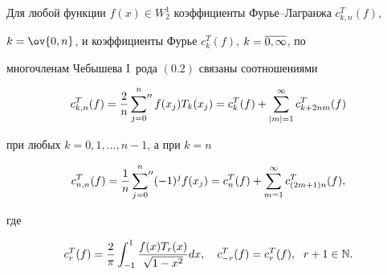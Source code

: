 \begin{lem}


Для любой функции $f(x)\in W_2^1$ коэффициенты Фурье--Лагранжа $c_{k,n}^T(f)$,\linebreak


$k=\ov{0,n}$, и коэффициенты Фурье $c_k^T(f)$, $k=\overline{0,\infty}$, по 


многочленам Чебышева $\mathrm I$~рода $(0.2)$ связаны соотношениями


\begin{equation}


c_{k,n}^T(f)=\frac{2}{n}\sideset{}{''}\sum_{j=0}^n f(x_j)T_k(x_j)=


c_k^T(f)+\sum_{|m|=1}^\infty c_{k+2nm}^T(f)


\end{equation}


при любых $k=0,1,\dots,n-1$, а при $k=n$


\begin{equation}


c_{n,n}^T(f)=\frac{1}{n}\sideset{}{''}\sum_{j=0}^n (-1)^jf(x_j)=


c_n^T(f)+\sum_{m=1}^\infty c_{(2m+1)n}^T(f),


\end{equation}


где


\begin{equation}


c_r^T(f)=\frac{2}{\pi}\int_{-1}^1\frac{f(x)T_r(x)}{\sqrt{1-x^2}}dx,\quad


c_{-r}^T(f)=c_r^T(f),\ \; r+1\in \N.


\end{equation}


\end{lem}








